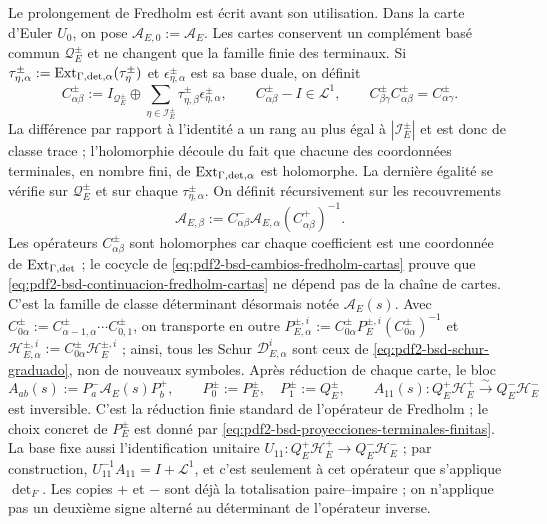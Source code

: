 Le prolongement de Fredholm est écrit avant son utilisation. Dans la carte d'Euler
$U_0$, on pose $\mathscr A_{E,0}:=\mathscr A_E$. Les cartes conservent un
complément basé commun $\mathscr Q_E^\pm$ et ne changent que la famille finie
des terminaux. Si
$\tau_{\eta,\alpha}^\pm:=
\operatorname{Ext}_{\Gamma,{\rm det},\alpha}(\tau_\eta^\pm)$ et
$\epsilon_{\eta,\alpha}^\pm$ est sa base duale, on définit
\begin{equation}\label{eq:pdf2-bsd-cambios-fredholm-cartas}
 C_{\alpha\beta}^\pm:=
 I_{\mathscr Q_E^\pm}\oplus
 \sum_{\eta\in\mathcal I_E^\pm}
 \tau_{\eta,\beta}^\pm\epsilon_{\eta,\alpha}^\pm,
 \qquad C_{\alpha\beta}^\pm-I\in\mathcal L^1,
 \qquad
 C_{\beta\gamma}^\pm C_{\alpha\beta}^\pm=C_{\alpha\gamma}^\pm.
\end{equation}
La différence par rapport à l'identité a un rang au plus égal à
$|\mathcal I_E^\pm|$ et est donc de classe trace ; l'holomorphie découle
du fait que chacune des coordonnées terminales, en nombre fini, de
$\operatorname{Ext}_{\Gamma,{\rm det},\alpha}$ est holomorphe. La dernière
égalité se vérifie sur $\mathscr Q_E^\pm$ et sur chaque
$\tau_{\eta,\alpha}^\pm$. On définit
récursivement sur les recouvrements
\begin{equation}\label{eq:pdf2-bsd-continuacion-fredholm-cartas}
 \mathscr A_{E,\beta}:=
 C_{\alpha\beta}^-\mathscr A_{E,\alpha}
 (C_{\alpha\beta}^+)^{-1}.
\end{equation}
Les opérateurs $C_{\alpha\beta}^\pm$ sont holomorphes car chaque coefficient
est une coordonnée de $\operatorname{Ext}_{\Gamma,{\rm det}}$ ; le cocycle de
\eqref{eq:pdf2-bsd-cambios-fredholm-cartas} prouve que
\eqref{eq:pdf2-bsd-continuacion-fredholm-cartas} ne dépend pas de la chaîne de
cartes. C'est la famille de classe déterminant désormais notée
$\mathscr A_E(s)$. Avec
$C_{0\alpha}^\pm:=C_{\alpha-1,\alpha}^\pm\cdots C_{0,1}^\pm$, on transporte
en outre
$P_{E,\alpha}^{\pm,i}:=
C_{0\alpha}^\pm P_E^{\pm,i}(C_{0\alpha}^\pm)^{-1}$ et
$\mathscr H_{E,\alpha}^{\pm,i}:=
C_{0\alpha}^\pm\mathscr H_E^{\pm,i}$ ; ainsi, tous les Schur
$\mathscr D_{E,\alpha}^i$ sont ceux de
\eqref{eq:pdf2-bsd-schur-graduado}, non de nouveaux symboles. Après réduction de chaque
carte, le bloc
\begin{equation}\label{eq:pdf2-bsd-bloques-fredholm}
 A_{ab}(s):=P_a^-\mathscr A_E(s)P_b^+,
 \qquad P_0^\pm:=P_E^\pm,\quad P_1^\pm:=Q_E^\pm,
 \qquad A_{11}(s):Q_E^+\mathscr H_E^+\xrightarrow{\sim}
                       Q_E^-\mathscr H_E^-
\end{equation}
est inversible. C'est la réduction finie standard de l'opérateur de Fredholm ;
le choix concret de $P_E^\pm$ est donné par
\eqref{eq:pdf2-bsd-proyecciones-terminales-finitas}. La base fixe aussi
l'identification unitaire
$U_{11}:Q_E^+\mathscr H_E^+\to Q_E^-\mathscr H_E^-$ ; par construction,
$U_{11}^{-1}A_{11}=I+\mathcal L^1$, et c'est seulement à cet opérateur que s'applique
$\det_F$. Les copies $+$ et $-$ sont déjà la totalisation paire--impaire ; on
n'applique pas un deuxième signe alterné au déterminant de l'opérateur inverse.

